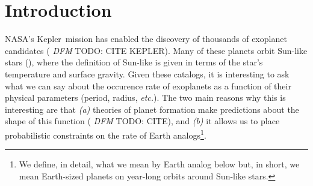\documentclass[12pt,preprint]{aastex}
\newcommand{\project}[1]{{\sffamily #1}}
\newcommand{\kepler}{\project{Kepler}}
\newcommand{\foreign}[1]{\emph{#1}}
\newcommand{\etc}{\foreign{etc.}}
\newcommand{\todo}[3]{{\color{#2} \emph{#1} TODO: #3}}
\newcommand{\dfmtodo}[1]{\todo{DFM}{red}{#1}}
\begin{document}

\section{Introduction}


NASA's \kepler\ mission has enabled the discovery of thousands of exoplanet
candidates (\dfmtodo{CITE KEPLER}).
Many of these planets orbit Sun-like stars (\citealt{petigura}), where the
definition of Sun-like is given in terms of the star's temperature and surface
gravity.
Given these catalogs, it is interesting to ask what we can say about the
occurence rate of exoplanets as a function of their physical parameters
(period, radius, \etc).
The two main reasons why this is interesting are that \emph{(a)} theories of
planet formation make predictions about the shape of this function
(\dfmtodo{CITE}), and \emph{(b)} it allows us to place probabilistic
constraints on the rate of Earth analogs\footnote{We define, in detail, what
we mean by Earth analog below but, in short, we mean Earth-sized planets on
year-long orbits around Sun-like stars.}.
\end{document}
